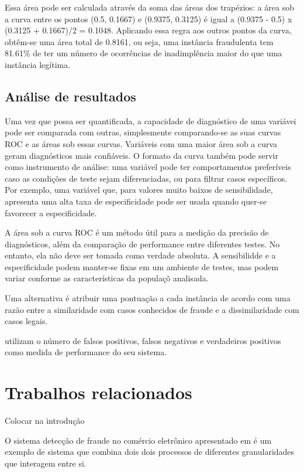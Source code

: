 Essa área pode ser calculada através da soma das áreas dos trapézios: a área sob a curva entre os pontos (0.5, 0.1667) e (0.9375, 0.3125) é igual a (0.9375 - 0.5) x (0.3125 + 0.1667)/2 = 0.1048. Aplicando essa regra aos outros pontos da curva, obtêm-se uma área total de 0.8161, ou seja, uma instância fraudulenta tem 81.61\% de ter um número de ocorrências de inadimplência maior do que uma instância legítima.

\subsection{Análise de resultados}

Uma vez que possa ser quantificada, a capacidade de diagnóstico de uma variávei pode ser comparada com outras, simplesmente comparando-se as suas curvas ROC e as áreas sob essas curvas. Variáveis com uma maior área sob a curva geram diagnósticos mais confiáveis. O formato da curva também pode servir como instrumento de análise: uma variável pode ter comportamentos preferíveis caso as condições de teste sejam diferenciadas, ou para filtrar casos específicos. Por exemplo, uma variável que, para valores muito baixos de sensibilidade, apresenta uma alta taxa de especificidade pode ser usada quando quer-se favorecer a especificidade.

A área sob a curva ROC é um método útil para a medição da precisão de diagnósticos, além da comparação de performance entre diferentes testes. No entanto, ela não deve ser tomada como verdade absoluta. A sensibilidde e a especificidade podem manter-se fixas em um ambiente de testes, mas podem variar conforme as características da populaçõ analisada.

\iffalse

Uma alternativa é atribuir uma pontuação a cada instância de acordo com uma razão entre a similaridade com casos conhecidos de fraude e a dissimilaridade com casos legais.

\citet{Aral2011} utilizam o número de falsos positivos, falsos negativos e verdadeiros positivos como medida de performance do seu sistema.

\section{Trabalhos relacionados}

Colocar na introdução

O sistema detecção de fraude no comércio eletrônico apresentado em \citet{Huang2010} é um exemplo de sistema que combina dois dois processos de diferentes granularidades que interagem entre si.

